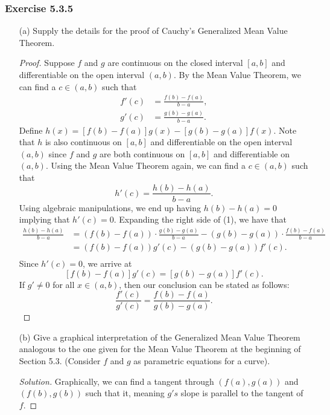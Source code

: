 \subsubsection{Exercise 5.3.5} 
\begin{enumerate}
    \item[(a)] Supply the details for the proof of Cauchy's Generalized Mean Value Theorem.
        \begin{proof}
            Suppose \( f  \) and \( g  \) are continuous on the closed interval \( [a,b]  \) and differentiable on the open interval \( (a,b)  \). By the Mean Value Theorem, we can find a \( c \in (a,b)  \) such that 
            \begin{align*}
                f'(c) &= \frac{ f(b) - f(a)  }{ b -a  },  \\
                g'(c) &= \frac{ g(b) - g(a)  }{ b -a  }.
            \end{align*}
            Define \( h(x)  = [f(b) -f(a) ] g(x) - [g(b) -g(a)] f(x)   \). Note that \( h  \) is also continuous on \( [a,b]  \) and differentiable on the open interval  \(  (a,b) \) since \( f  \) and \( g  \) are both continuous on \( [a,b]  \) and differentiable on \( (a,b)  \). Using the Mean Value Theorem again, we can find a \( c \in (a,b)  \) such that 
            \[  h'(c) = \frac{ h(b) - h(a)  }{ b - a  }. \tag{1}  \]
            Using algebraic manipulations, we end up having \( h(b) - h(a) = 0  \) implying that \( h'(c) = 0  \). Expanding the right side of (1), we have that 
            \begin{align*}
                \frac{ h(b) - h(a)  }{ b -a  } &= (f(b) -f(a)) \cdot \frac{  g(b) - g(a)}{ b - a }  - (g(b) - g(a)) \cdot \frac{f(b) - f(a)}{ b - a  }  \\
                                               &=  (f(b) - f(a)) g'(c) - (g(b) -g(a)) f'(c). \\
            \end{align*}
            Since \( h'(c) = 0  \), we arrive at 
            \[  [f(b) - f(a)] g'(c) = [g(b) - g(a)] f'(c). \]
            If \( g' \neq 0  \) for all \( x \in (a,b)  \), then our conclusion can be stated as follows:
            \[  \frac{ f'(c)  }{ g'(c)  } = \frac{ f(b) - f(a)  }{ g(b) - g(a)  }. \]
        \end{proof}
    \item[(b)] Give a graphical interpretation of the Generalized Mean Value Theorem analogous to the one given for the Mean Value Theorem at the beginning of Section 5.3. (Consider \( f  \) and \( g  \) as parametric equations for a curve).
        \begin{proof}[Solution]
        Graphically, we can find a tangent through \( (f(a) , g(a))  \) and \( (f(b) , g(b) ) \) such that it, meaning \( g's  \) slope is parallel to the tangent of \(  f   \).
        \end{proof}
\end{enumerate}


